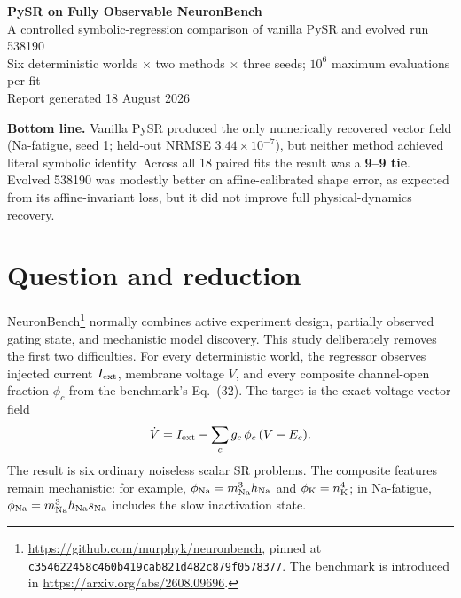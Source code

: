 \documentclass[10pt]{article}
\begin{document}
\begin{center}
{\color{navy}\LARGE\bfseries PySR on Fully Observable NeuronBench}\\[0.55em]
{\large A controlled symbolic-regression comparison of vanilla PySR and evolved run 538190}\\[0.8em]
{\small Six deterministic worlds $\times$ two methods $\times$ three seeds; $10^6$ maximum evaluations per fit}\\[0.25em]
{\small Report generated 18 August 2026}
\end{center}

\vspace{0.6em}
\noindent\colorbox{softgray}{\parbox{0.96\linewidth}{
\textbf{Bottom line.} Vanilla PySR produced the only numerically recovered vector field
(Na-fatigue, seed 1; held-out NRMSE $3.44\!\times\!10^{-7}$), but neither
method achieved literal symbolic identity. Across all 18 paired fits the result was a
\textbf{9--9 tie}. Evolved 538190 was modestly better on affine-calibrated shape error,
as expected from its affine-invariant loss, but it did not improve full physical-dynamics recovery.
}}

\section{Question and reduction}

NeuronBench\footnote{\url{https://github.com/murphyk/neuronbench}, pinned at
\texttt{c354622458c460b419cab821d482c879f0578377}. The benchmark is introduced in
\url{https://arxiv.org/abs/2608.09696}.} normally combines active experiment design,
partially observed gating state, and mechanistic model discovery. This study deliberately removes
the first two difficulties. For every deterministic world, the regressor observes injected current
$I_{\rm ext}$, membrane voltage $V$, and every composite channel-open fraction $\phi_c$ from the
benchmark's Eq.~(32). The target is the exact voltage vector field
\begin{equation}
\dot V = I_{\rm ext} - \sum_c g_c\,\phi_c\,(V-E_c).
\label{eq:vectorfield}
\end{equation}
The result is six ordinary noiseless scalar SR problems. The composite features remain mechanistic:
for example, $\phi_{\rm Na}=m_{\rm Na}^3h_{\rm Na}$ and
$\phi_{\rm K}=n_{\rm K}^4$; in Na-fatigue,
$\phi_{\rm Na}=m_{\rm Na}^3h_{\rm Na}s_{\rm Na}$ includes the slow inactivation state.
\end{document}
